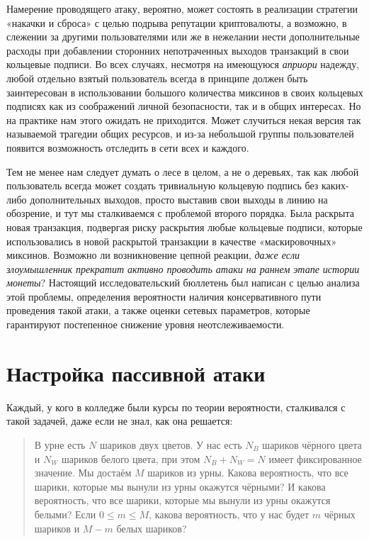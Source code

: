 \documentclass{mrl}
\begin{document}
Намерение проводящего атаку, вероятно, может состоять в реализации стратегии «накачки и сброса» с целью подрыва репутации криптовалюты, а возможно, в слежении за другими пользователями или же в нежелании нести дополнительные расходы при добавлении сторонних непотраченных выходов транзакций в свои кольцевые подписи. Во всех случаях, несмотря на имеющуюся \emph{априори} надежду, любой отдельно взятый пользователь всегда в принципе должен быть заинтересован в использовании большого количества миксинов в своих кольцевых подписях как из соображений личной безопасности, так и в общих интересах. Но на практике нам этого ожидать не приходится. Может случиться некая версия так называемой трагедии общих ресурсов, и из-за небольшой группы пользователей появится возможность отследить в сети всех и каждого.

Тем не менее нам следует думать о лесе в целом, а не о деревьях, так как любой пользователь всегда может создать тривиальную кольцевую подпись без каких-либо дополнительных выходов, просто выставив свои выходы в линию на обозрение, и тут мы сталкиваемся с проблемой второго порядка. Была раскрыта новая транзакция, подвергая риску раскрытия любые кольцевые подписи, которые использовались в новой раскрытой транзакции в качестве «маскировочных» миксинов. Возможно ли возникновение цепной реакции, \emph{даже если злоумышленник прекратит активно проводить атаки на раннем этапе истории монеты}? Настоящий исследовательский бюллетень был написан с целью анализа этой проблемы, определения вероятности наличия консервативного пути проведения такой атаки, а также оценки сетевых параметров, которые гарантируют постепенное снижение уровня неотслеживаемости.

\section{Настройка пассивной атаки}
Каждый, у кого в колледже были курсы по теории вероятности, сталкивался с такой задачей, даже если не знал, как она решается:

\begin{quote}
В урне есть $N$ шариков двух цветов. У нас есть $N_B$ шариков чёрного цвета и $N_W$ шариков белого цвета, при этом $N_B + N_W = N$ имеет фиксированное значение. Мы достаём $M$ шариков из урны. Какова вероятность, что все шарики, которые мы вынули из урны окажутся чёрными? И какова вероятность, что все шарики, которые мы вынули из урны окажутся белыми? Если $0 \leq m \leq M$, какова вероятность, что у нас будет $m$ чёрных шариков и $M-m$ белых шариков?
\end{quote}
\end{document}
